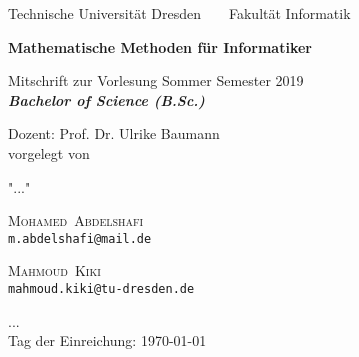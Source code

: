 \documentclass[a4paper,12pt]{report}
\makeatletter
\newcommand{\nameE}{Abdelshafi}
\newcommand{\vornameE}{Mohamed}
\newcommand{\emailE}{m.abdelshafi@mail.de}
\newcommand{\nameS}{Kiki}
\newcommand{\vornameS}{Mahmoud}
\newcommand{\emailS}{mahmoud.kiki@tu-dresden.de}
\theoremstyle{plain} %
\theoremstyle{break}
\newcommand{\thema}{Mathematische Methoden für Informatiker}
\newcommand{\datum}{\today}%
\makeatother
\begin{document}




	\thispagestyle{empty}


    \begin{center}
    {\Large
    Technische Universit\"{a}t Dresden\  \ \textbullet\ \ Fakult\"{a}t Informatik
    }

        \vfil

        {\bfseries\Huge\thema}

        \vfil

        {\LARGE
Mitschrift zur Vorlesung Sommer Semester 2019  \\[\bigskipamount]

        \bfseries{\itshape Bachelor of Science  \textup{(}B.Sc.\textup{)}}\\[\bigskipamount]
        }%

        \vfil\vfil\vfil
        Dozent: Prof. Dr. Ulrike Baumann \\
        vorgelegt von\\
        \item "..." \\
        \item \textsc{\vornameE\ \nameE } \\ \texttt{\emailE} \\  \item
        \textsc{\vornameS\ \nameS \qquad } \\ \texttt{\emailS}  \\
        \item ... \\
        Tag der Einreichung: \datum\\[\bigskipamount]

    \end{center}


    \cleardoublepage



    \tableofcontents

    \thispagestyle{empty}



    \setcounter{page}{0}
\end{document}
